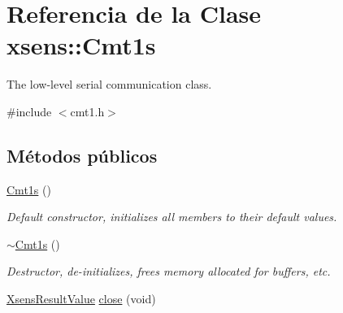\hypertarget{classxsens_1_1Cmt1s}{\section{\-Referencia de la \-Clase xsens\-:\-:\-Cmt1s}
\label{classxsens_1_1Cmt1s}
}


\-The low-\/level serial communication class.  




{\ttfamily \#include $<$cmt1.\-h$>$}

\subsection*{\-Métodos públicos}
\begin{DoxyCompactItemize}
\item 
\hypertarget{classxsens_1_1Cmt1s_a04d25a1665542ca7fa840db99fd91a07}{\hyperlink{classxsens_1_1Cmt1s_a04d25a1665542ca7fa840db99fd91a07}{\-Cmt1s} ()}\label{classxsens_1_1Cmt1s_a04d25a1665542ca7fa840db99fd91a07}

\begin{DoxyCompactList}\small\item\em \-Default constructor, initializes all members to their default values. \end{DoxyCompactList}\item 
\hypertarget{classxsens_1_1Cmt1s_acb907ca4246dc9b76f38dfdf46a2d212}{\hyperlink{classxsens_1_1Cmt1s_acb907ca4246dc9b76f38dfdf46a2d212}{$\sim$\-Cmt1s} ()}\label{classxsens_1_1Cmt1s_acb907ca4246dc9b76f38dfdf46a2d212}

\begin{DoxyCompactList}\small\item\em \-Destructor, de-\/initializes, frees memory allocated for buffers, etc. \end{DoxyCompactList}\item 
\hypertarget{classxsens_1_1Cmt1s_a29d64fe8e43430225b02450cac4a65eb}{\hyperlink{group__enums_ga822a2260a20af524029eef9e9a51ff6f}{\-Xsens\-Result\-Value} \hyperlink{classxsens_1_1Cmt1s_a29d64fe8e43430225b02450cac4a65eb}{close} (void)}\label{classxsens_1_1Cmt1s_a29d64fe8e43430225b02450cac4a65eb}


\end{DoxyCompactItemize}
